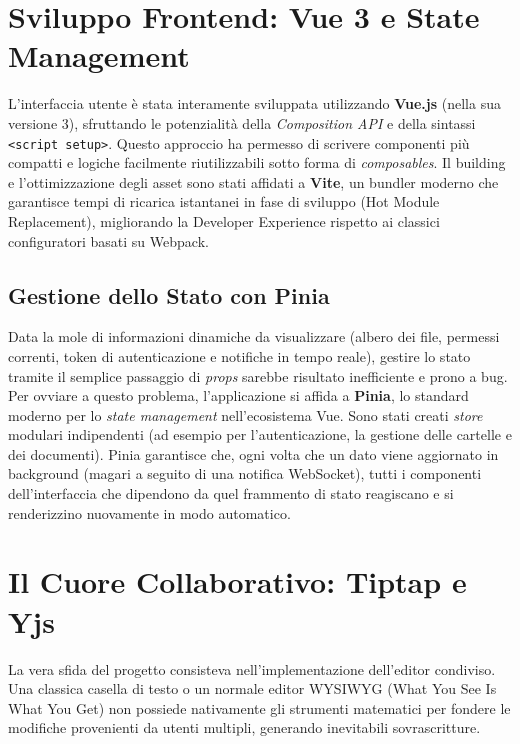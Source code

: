 \documentclass[11pt,a4paper]{report}
\begin{document}
\section{Sviluppo Frontend: Vue 3 e State Management}
L'interfaccia utente è stata interamente sviluppata utilizzando \textbf{Vue.js} (nella sua versione 3), sfruttando le potenzialità della \textit{Composition API} e della sintassi \texttt{<script setup>}. Questo approccio ha permesso di scrivere componenti più compatti e logiche facilmente riutilizzabili sotto forma di \textit{composables}.
Il building e l'ottimizzazione degli asset sono stati affidati a \textbf{Vite}, un bundler moderno che garantisce tempi di ricarica istantanei in fase di sviluppo (Hot Module Replacement), migliorando la Developer Experience rispetto ai classici configuratori basati su Webpack.

\subsection{Gestione dello Stato con Pinia}
Data la mole di informazioni dinamiche da visualizzare (albero dei file, permessi correnti, token di autenticazione e notifiche in tempo reale), gestire lo stato tramite il semplice passaggio di \textit{props} sarebbe risultato inefficiente e prono a bug. Per ovviare a questo problema, l'applicazione si affida a \textbf{Pinia}, lo standard moderno per lo \textit{state management} nell'ecosistema Vue. 
Sono stati creati \textit{store} modulari indipendenti (ad esempio per l'autenticazione, la gestione delle cartelle e dei documenti). Pinia garantisce che, ogni volta che un dato viene aggiornato in background (magari a seguito di una notifica WebSocket), tutti i componenti dell'interfaccia che dipendono da quel frammento di stato reagiscano e si renderizzino nuovamente in modo automatico.

\section{Il Cuore Collaborativo: Tiptap e Yjs}
La vera sfida del progetto consisteva nell'implementazione dell'editor condiviso. Una classica casella di testo o un normale editor WYSIWYG (What You See Is What You Get) non possiede nativamente gli strumenti matematici per fondere le modifiche provenienti da utenti multipli, generando inevitabili sovrascritture.
\end{document}
